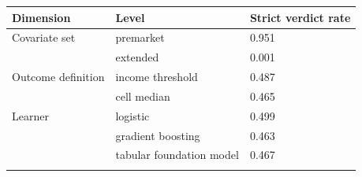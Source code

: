\setlength{\tabcolsep}{4pt}
\begin{tabular}{@{}lll@{}}
\toprule
Dimension & Level & Strict verdict rate\\
\midrule
Covariate set & premarket & 0.951\\
 & extended & 0.001\\
Outcome definition & income threshold & 0.487\\
 & cell median & 0.465\\
Learner & logistic & 0.499\\
 & gradient boosting & 0.463\\
 & tabular foundation model & 0.467\\
\botrule
\end{tabular}
